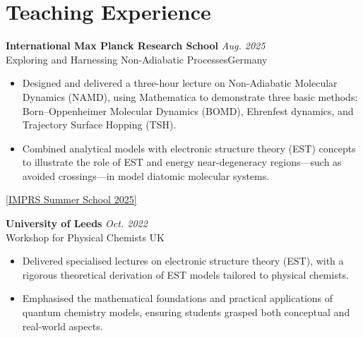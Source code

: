 \section{\sc Teaching Experience}

{\bf  International Max Planck Research School } \hfill \textit{Aug. 2025} \\
Exploring and Harnessing Non-Adiabatic Processes\hfill Germany
\begin{itemize}
    \setlength\itemsep{0em}
     \item Designed and delivered a three-hour lecture on Non-Adiabatic Molecular Dynamics (NAMD), using Mathematica to demonstrate three basic methods: Born–Oppenheimer Molecular Dynamics (BOMD), Ehrenfest dynamics, and Trajectory Surface Hopping (TSH).
    \item Combined analytical models with electronic structure theory (EST) concepts to illustrate the role of EST and energy near-degeneracy regions—such as avoided crossings—in model diatomic molecular systems.
\end{itemize}
\vspace{-2.2em} \hfill \href{https://www.imprs-pks.mpg.de/events/schools-and-workshops}{[IMPRS Summer School 2025]}

{\bf University of Leeds } \hfill \textit{Oct. 2022} \\
Workshop for Physical Chemists \hfill UK
\begin{itemize}
    \setlength\itemsep{0em}
    \item Delivered specialised lectures on electronic structure theory (EST), with a rigorous theoretical derivation of EST models tailored to physical chemists.
    \item Emphasised the mathematical foundations and practical applications of quantum chemistry models, ensuring students grasped both conceptual and real-world aspects.
\end{itemize}

